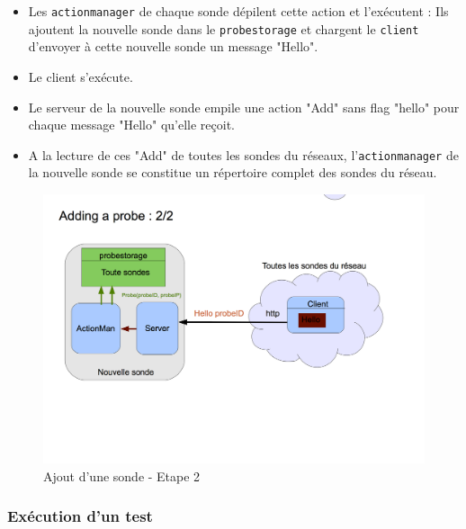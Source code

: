 \documentclass[a4paper,11pt]{article}
\begin{document}
\begin{itemize}
\item Les \texttt{actionmanager} de chaque sonde dépilent cette action et l'exécutent : Ils ajoutent la nouvelle sonde dans le \texttt{probestorage} et chargent le \texttt{client} d'envoyer à cette nouvelle sonde un message "Hello".
\item Le client s'exécute.
\item Le serveur de la nouvelle sonde empile une action "Add" sans flag "hello" pour chaque message "Hello" qu'elle reçoit.
\item A la lecture de ces "Add" de toutes les sondes du réseaux, l'\texttt{actionmanager} de la nouvelle sonde se constitue un répertoire complet des sondes du réseau.
\end{itemize}

\begin{figure}[!ht]
\centering\includegraphics[width=\linewidth]{img/graphAdd2.png}
\caption{Ajout d'une sonde - Etape 2}
\end{figure}

\FloatBarrier
\subsubsection{Exécution d'un test}
\end{document}
